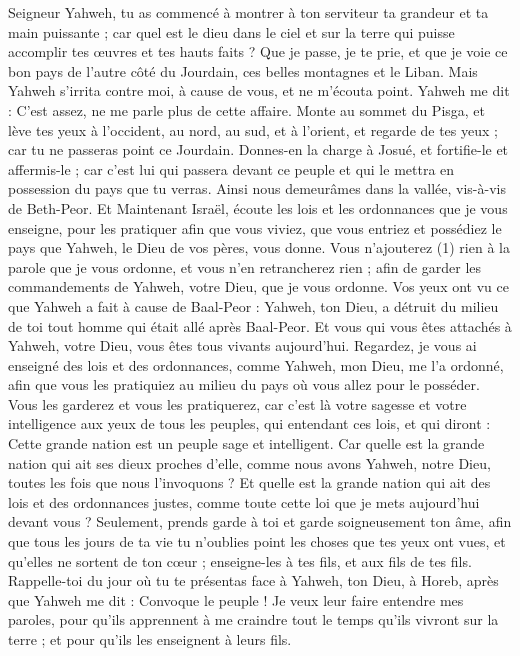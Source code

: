 \begin{multicols}{2}
Seigneur Yahweh, tu as commencé à montrer à ton serviteur ta grandeur et ta main puissante ; car quel est le dieu dans le ciel et sur la terre qui puisse accomplir tes œuvres et tes hauts faits ?
Que je passe, je te prie, et que je voie ce bon pays de l’autre côté du Jourdain, ces belles montagnes et le Liban.
Mais Yahweh s’irrita contre moi, à cause de vous, et ne m'écouta point. Yahweh me dit : C'est assez, ne me parle plus de cette affaire.
Monte au sommet du Pisga, et lève tes yeux à l'occident, au nord, au sud, et à l'orient, et regarde de tes yeux ; car tu ne passeras point ce Jourdain.
Donnes-en la charge à Josué, et fortifie-le et affermis-le ; car c'est lui qui passera devant ce peuple et qui le mettra en possession du pays que tu verras.
Ainsi nous demeurâmes dans la vallée, vis-à-vis de Beth-Peor.
\VerseOne{}Et Maintenant Israël, écoute les lois et les ordonnances que je vous enseigne, pour les pratiquer afin que vous viviez, que vous entriez et possédiez le pays que Yahweh, le Dieu de vos pères, vous donne.
Vous n'ajouterez (1) rien à la parole que je vous ordonne, et vous n'en retrancherez rien ; afin de garder les commandements de Yahweh, votre Dieu, que je vous ordonne.
Vos yeux ont vu ce que Yahweh a fait à cause de Baal-Peor : Yahweh, ton Dieu, a détruit du milieu de toi tout homme qui était allé après Baal-Peor.
Et vous qui vous êtes attachés à Yahweh, votre Dieu, vous êtes tous vivants aujourd'hui.
Regardez, je vous ai enseigné des lois et des ordonnances, comme Yahweh, mon Dieu, me l'a ordonné, afin que vous les pratiquiez au milieu du pays où vous allez pour le posséder.
Vous les garderez et vous les pratiquerez, car c'est là votre sagesse et votre intelligence aux yeux de tous les peuples, qui entendant ces lois, et qui diront : Cette grande nation est un peuple sage et intelligent.
Car quelle est la grande nation qui ait ses dieux proches d’elle, comme nous avons Yahweh, notre Dieu, toutes les fois que nous l’invoquons ?
Et quelle est la grande nation qui ait des lois et des ordonnances justes, comme toute cette loi que je mets aujourd'hui devant vous ?
Seulement, prends garde à toi et garde soigneusement ton âme, afin que tous les jours de ta vie tu n'oublies point les choses que tes yeux ont vues, et qu’elles ne sortent de ton cœur ; enseigne-les à tes fils, et aux fils de tes fils.
Rappelle-toi du jour où tu te présentas face à Yahweh, ton Dieu, à Horeb, après que Yahweh me dit : Convoque le peuple ! Je veux leur faire entendre mes paroles, pour qu’ils apprennent à me craindre tout le temps qu'ils vivront sur la terre ; et pour qu’ils les enseignent à leurs fils.

\end{multicols}
